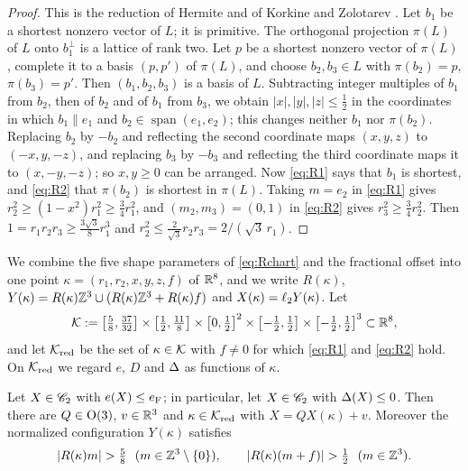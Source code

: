 \begin{proof}
This is the reduction of Hermite and of Korkine and Zolotarev \cite{KorkineZolotareff1873}. Let $b_1$ be a shortest nonzero vector of
$L$; it is primitive. The orthogonal projection $\pi(L)$ of $L$ onto $b_1^\perp$ is a lattice of rank two. Let $p$ be a shortest nonzero
vector of $\pi(L)$, complete it to a basis $(p,p')$ of $\pi(L)$, and choose $b_2,b_3\in L$ with $\pi(b_2)=p$, $\pi(b_3)=p'$. Then
$(b_1,b_2,b_3)$ is a basis of $L$. Subtracting integer multiples of $b_1$ from $b_2$, then of $b_2$ and of $b_1$ from $b_3$, we obtain
$|x|,|y|,|z|\le\frac12$ in the coordinates in which $b_1\parallel e_1$ and $b_2\in\operatorname{span}(e_1,e_2)$; this changes neither
$b_1$ nor $\pi(b_2)$. Replacing $b_2$ by $-b_2$ and reflecting the second coordinate maps $(x,y,z)$ to $(-x,y,-z)$, and replacing $b_3$
by $-b_3$ and reflecting the third coordinate maps it to $(x,-y,-z)$; so $x,y\ge0$ can be arranged. Now \eqref{eq:R1} says that $b_1$
is shortest, and \eqref{eq:R2} that $\pi(b_2)$ is shortest in $\pi(L)$. Taking $m=e_2$ in \eqref{eq:R1} gives
$r_2^2\ge(1-x^2)r_1^2\ge\frac34r_1^2$, and $(m_2,m_3)=(0,1)$ in \eqref{eq:R2} gives $r_3^2\ge\frac34r_2^2$. Then
$1=r_1r_2r_3\ge\frac{3\sqrt3}8r_1^3$ and $r_2^2\le\frac2{\sqrt3}r_2r_3=2/(\sqrt3\,r_1)$.
\end{proof}

We combine the five shape parameters of \eqref{eq:Rchart} and the fractional offset into one point $\kappa=(r_1,r_2,x,y,z,f)$ of
$\mathbb R^8$, and we write $R(\kappa)$, $Y(\kappa)=R(\kappa)\mathbb Z^3\cup(R(\kappa)\mathbb Z^3+R(\kappa)f)$ and $X(\kappa)=\ell_2 Y(\kappa)$. Let
\begin{equation}\label{eq:Kbox}
  \mathcal K:=\bigl[\tfrac58,\tfrac{37}{32}\bigr]\times\bigl[\tfrac12,\tfrac{11}8\bigr]\times\bigl[0,\tfrac12\bigr]^2
      \times\bigl[-\tfrac12,\tfrac12\bigr]\times\bigl[-\tfrac12,\tfrac12\bigr]^3\subset\mathbb R^8 ,
\end{equation}
and let $\mathcal K_{\mathrm{red}}$ be the set of $\kappa\in\mathcal K$ with $f\ne0$ for which \eqref{eq:R1} and \eqref{eq:R2} hold. On
$\mathcal K_{\mathrm{red}}$ we regard $e$, $D$ and $\Delta$ as functions of $\kappa$.

\begin{proposition}\label{prop:compact}
Let $X\in\mathscr C_2$ with $e(X)\le e_{\mathrm F}$; in particular, let $X\in\mathscr C_2$ with $\Delta(X)\le0$. Then there are $Q\in\mathrm{O}(3)$, $v\in\mathbb R^3$ and
$\kappa\in\mathcal K_{\mathrm{red}}$ with $X=QX(\kappa)+v$. Moreover the normalized configuration $Y(\kappa)$ satisfies
\begin{equation}\label{eq:sepstrict}
  |R(\kappa)m|>\tfrac58\ \ (m\in\Z^3\setminus\{0\}),\qquad |R(\kappa)(m+f)|>\tfrac12\ \ (m\in\Z^3).
\end{equation}
\end{proposition}

